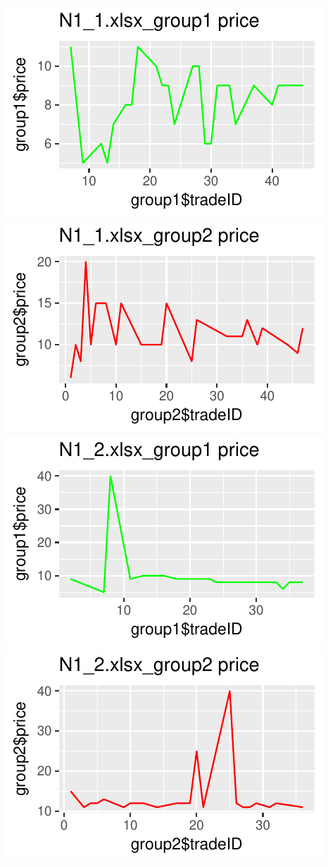 \documentclass[]{article}
\begin{document}
\includegraphics{finance_homework_files/figure-latex/unnamed-chunk-4-1.pdf}
\includegraphics{finance_homework_files/figure-latex/unnamed-chunk-4-2.pdf}
\includegraphics{finance_homework_files/figure-latex/unnamed-chunk-4-3.pdf}
\includegraphics{finance_homework_files/figure-latex/unnamed-chunk-4-4.pdf}
\end{document}
